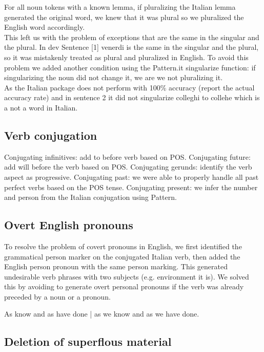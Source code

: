 \documentclass{article}
\begin{document}
For all noun tokens with a known lemma, if pluralizing the Italian lemma generated the original word, we knew that it was plural so we pluralized the English word accordingly. \\

\noindent This left us with the problem of exceptions that are the same in the singular and the plural. In dev Sentence [1] venerdi is the same in the singular and the plural, so it was mistakenly treated as plural and pluralized in English. To avoid this problem we added another condition using the Pattern.it singularize function: if singularizing the noun did not change it, we are we not pluralizing it. \\

As the Italian package does not perform with 100\% accuracy (report the actual accuracy rate) and in sentence 2 it did not singularize colleghi to collehe which is a not a word in Italian.

\subsection{Verb conjugation}


Conjugating infinitives: add to before verb based on POS.
Conjugating future: add will before the verb based on POS.
Conjugating gerunds: identify the verb aspect as progressive.
Conjugating past: we were able to properly handle all past perfect verbs based on the POS tense.
Conjugating present: we infer the number and person from the Italian conjugation using Pattern.


\subsection{Overt English pronouns}

To resolve the problem of covert pronouns in English, we first identified the grammatical person marker on the conjugated Italian verb, then added the English person pronoun with the same person marking. This generated undesirable verb phrases with two subjects (e.g. environment it is). We solved this by avoiding to generate overt personal pronouns if the verb was already preceded by a noun or a pronoun.

As know and as have done | as we know and as we have done.


\subsection{Deletion of superflous material}
\end{document}
